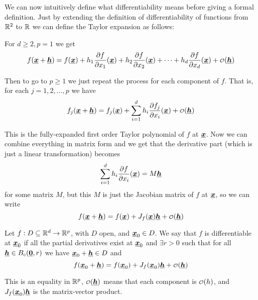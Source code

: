 \documentclass[12pt]{extarticle}
\renewcommand{\vec}[1]{\uvec{#1}}
\begin{document}
We can now intuitively define what differentiability means before giving a formal definition.
Just by extending the definition of differentiability of functions from $\mathbb{R}^2$ to $\mathbb{R}$ we can define the Taylor expansion as follows:

For $d \geq 2, p = 1$ we get
\begin{equation}
    f(\vec{x} + \vec{h}) = f(\vec{x}) + h_1 \pdv{f}{x_1}()(\vec{x}) + h_2 \pdv{f}{x_2}()(\vec{x}) + \cdots + h_d \pdv{f}{x_d}()(\vec{x}) + \o(\vec{h})
\end{equation}

Then to go to $p \geq 1$ we just repeat the process for each component of $f$.
That is, for each $j = 1, 2, \ldots, p$ we have
\begin{equation}
    f_j(\vec{x} + \vec{h}) = f_j(\vec{x}) + \sum_{i=1}^d h_i \pdv{f_j}{x_i}()(\vec{x}) + \o(\vec{h})
\end{equation}

This is the fully-expanded first order Taylor polynomial of $f$ at $\vec{x}$.
Now we can combine everything in matrix form and we get that the derivative part (which is just a linear transformation) becomes
\begin{equation}
    \sum_{i = 1}^d h_i \pdv{f}{x_i}()(\vec{x}) = M \vec{h}
\end{equation}
for some matrix $M$, but this $M$ is just the Jacobian matrix of $f$ at $\vec{x}$, so we can write
\begin{equation}
    f(\vec{x} + \vec{h}) = f(\vec{x}) + J_f(\vec{x}) \vec{h} + \o(\vec{h})
\end{equation}

\begin{definition}[differentiability]
    Let $f: D \subseteq \mathbb{R}^d \to \mathbb{R}^p$, with $D$ open, and $\vec{x}_0 \in D$.
    We say that $f$ is differentiable at $\vec{x}_0$ if all the partial derivatives exist at $\vec{x}_0$
    and $\exists r > 0$ such that for all $\vec{h} \in B_c(\vec{0}, r)$ we have $\vec{x}_0 + \vec{h} \in D$ and
    \begin{equation}
        f(\vec{x}_0 + \vec{h}) = f(\vec{x}_0) + J_f(\vec{x}_0) \vec{h} + \o(\vec{h})
    \end{equation}
\end{definition}

\begin{remark}
    This is an equality in $\mathbb{R}^p$, $\o(\vec{h})$ means that each component is $\o(h)$, and $J_f(\vec{x}_0) \vec{h}$ is the matrix-vector product.
\end{remark}
\end{document}

